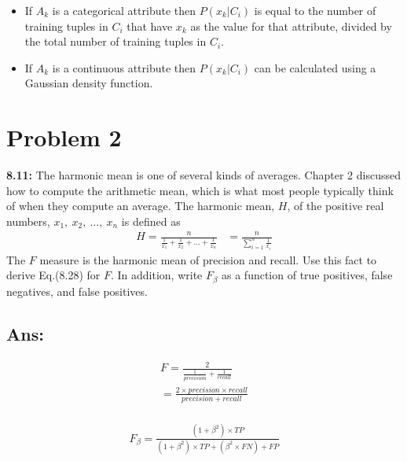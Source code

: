 \begin{itemize}
	\begin{itemize}
		
		\item If $A_{k}$ is a categorical attribute then $P(x_{k} \vert C_{i})$ is equal to the number of training tuples in $C_{i}$
		that have $x_{k}$ as the value for that attribute, divided by the total number of training tuples in $C_{i}$.

		\item If $A_{k}$ is a continuous attribute then $P(x_{k} \vert C_{i})$ can be calculated using a Gaussian density function.

	\end{itemize}

\end{itemize}


\section*{Problem 2}
\textbf{8.11:} The harmonic mean is one of several kinds of averages. 
Chapter 2 discussed how to compute the arithmetic mean, 
which is what most people typically think of when they compute an average. 
The harmonic mean, $H$, of the positive real numbers, $x_{1},~x_{2},~ \ldots,~x_{n}$ is defined as \\
\begin{equation*}
	\begin{aligned}
		H = \frac{n}{ \frac{1}{x_{1}} + \frac{1}{x_{2}} + \ldots + \frac{1}{x_{n}}} 
		& = \frac{n}{\sum_{i=1}^{n} \frac{1}{x_{i}}}
	\end{aligned}
\end{equation*}
The $F$ measure is the harmonic mean of precision and recall. 
Use this fact to derive Eq.(8.28) for $F$. 
In addition, write $F_{\beta}$ as a function of true positives, 
false negatives, and false positives.
\subsection*{Ans:}

\begin{gather*}
	F = \frac{2}{\frac{1}{precision} + \frac{1}{recall}} \\
	  = \frac{2 \times precision \times recall}{precision + recall} \\
\end{gather*}

\begin{gather*}
	F_{\beta} = \frac{(1 + \beta^2) \times TP}{(1 + \beta^2) \times TP + (\beta^2 \times FN) + FP}
\end{gather*}

